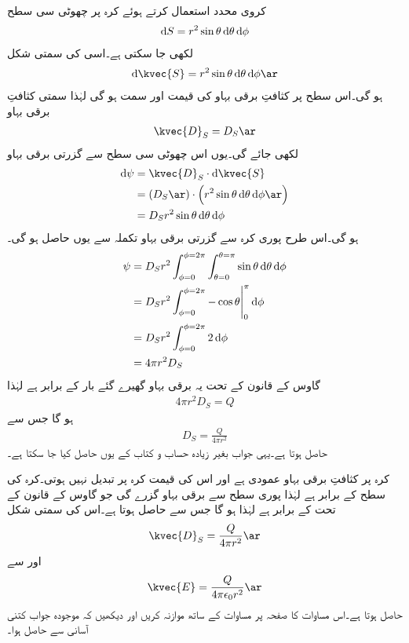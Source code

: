 کروی محدد استعمال کرتے ہوئے کرہ پر چھوٹی سی سطح
\begin{align*}
\dif S=r^2 \sin \theta \dif \theta \dif \phi
\end{align*}
لکھی جا سکتی ہے۔اسی کی سمتی شکل
\begin{align*}
\dif \kvec{S}=r^2 \sin \theta \dif \theta \dif \phi \ar
\end{align*}
ہو گی۔اس سطح پر کثافتِ برقی بہاو کی قیمت  اور سمت  ہو گی لہٰذا سمتی کثافتِ برقی بہاو 
\begin{align*}
\kvec{D}_S=D_S \ar
\end{align*}
لکھی جائے گی۔یوں اس چھوٹی سی سطح سے گزرتی برقی بہاو
\begin{align*}
\dif \psi&=\kvec{D}_S \cdot \dif \kvec{S}\\
&=\left( D_S \ar \right) \cdot \left(r^2 \sin \theta \dif \theta \dif \phi \ar \right)\\
&= D_S r^2 \sin \theta \dif \theta \dif \phi
\end{align*}
ہو  گی۔اس طرح پوری کرہ سے گزرتی برقی بہاو تکملہ سے یوں حاصل ہو گی۔
\begin{align*}
\psi&=D_S r^2  \int_{\phi=0}^{\phi=2\pi}\int_{\theta=0}^{\theta=\pi} \sin \theta \dif \theta \dif \phi\\
&=D_S r^2 \int_{\phi=0}^{\phi=2\pi} \eval{-\cos \theta}_0^{\pi} \dif \phi\\
&=D_S r^2 \int_{\phi=0}^{\phi=2\pi} 2 \dif \phi\\
&=4 \pi r^2 D_S
\end{align*}
گاوس کے قانون کے تحت یہ برقی بہاو گھیرے گئے بار  کے برابر ہے لہٰذا
\begin{align*}
4 \pi r^2 D_S=Q
\end{align*}
ہو گا جس سے
\begin{align*}
D_S=\frac{Q}{4 \pi r^2}
\end{align*}
حاصل ہوتا ہے۔یہی جواب بغیر زیادہ حساب و کتاب کے یوں حاصل کیا جا سکتا ہے۔

کرہ پر کثافتِ برقی بہاو  عمودی ہے اور اس کی قیمت کرہ پر تبدیل نہیں ہوتی۔کرہ کی سطح  کے برابر ہے لہٰذا پوری سطح سے  برقی بہاو گزرے گی جو گاوس کے قانون کے تحت  کے برابر ہے لہٰذا  ہو گا جس سے  حاصل ہوتا ہے۔اس کی سمتی شکل
\begin{align}
\kvec{D}_S=\frac{Q}{4\pi r^2} \ar
\end{align}
اور  سے
\begin{align}
\kvec{E}=\frac{Q}{4\pi \epsilon_0 r^2} \ar
\end{align}
حاصل ہوتا ہے۔اس مساوات کا صفحہ  پر مساوات  کے ساتھ موازنہ کریں اور دیکھیں کہ موجودہ جواب کتنی آسانی سے حاصل ہوا۔

